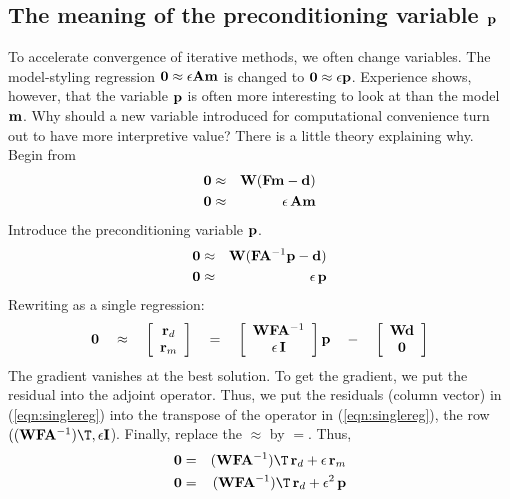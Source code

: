 \subsection{The meaning of the preconditioning variable $\bold p$}

To accelerate convergence of iterative methods, we often change variables.
The model-styling regression $\bold 0 \approx \epsilon \bold A \bold m$
is changed to $\bold 0 \approx \epsilon \bold p$.
Experience shows, however, that the variable $\bold p$ is often more interesting
to look at than the model $\bold m$.
Why should a new variable introduced for computational convenience
turn out to have more interpretive value?
There is a little theory explaining why.  Begin from
\begin{eqnarray}
\bold 0 &\approx& \bold W (\bold F \bold m -\bold d)
\\
\bold 0 &\approx& \epsilon\, \bold A \bold m
\end{eqnarray}
Introduce the preconditioning variable $\bold p$.
\begin{eqnarray}
\bold 0 &\approx& \bold W (\bold F \bold A^{-1}\bold p -\bold d)
\\
\bold 0 &\approx& \epsilon\, \bold p
\end{eqnarray}
Rewriting as a single regression:
\begin{equation}
\label{eqn:singlereg}
\bold 0 
\quad\approx\quad
\left[
\begin{array}{c}
\bold r_d \\
\bold r_m
\end{array}
\right]
\quad=\quad
\left[
\begin{array}{c}
\bold W\bold F\bold A^{-1} \\
\epsilon\, \bold I
\end{array}
\right]
\bold p
\quad - \quad
\left[
\begin{array}{c}
\bold W \bold d \\
\bold 0
\end{array}
\right]
\end{equation}
The gradient vanishes at the best solution.
To get the gradient,
we put the residual into the adjoint operator.
Thus,
we put the residuals (column vector) in
(\ref{eqn:singlereg})
into the transpose of the operator in
(\ref{eqn:singlereg}),
the row $( (\bold W\bold F\bold A^{-1})\T, \epsilon \bold I$).
Finally,
replace the $\approx$ by $=$.
Thus,
\begin{eqnarray}
\nonumber
\bold 0 &=& (\bold W\bold F\bold A^{-1})\T\,\bold r_d + \epsilon \, \bold r_m 
\\
\label{eqn:fight}
\bold 0 &=& (\bold W\bold F\bold A^{-1})\T\,\bold r_d + \epsilon^2 \, \bold p
\end{eqnarray}
